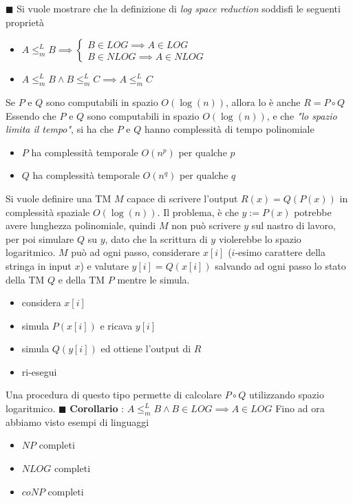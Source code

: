 \documentclass[10pt, letterpaper]{report}
\begin{document}
\hfill$\blacksquare$\acc 
Si vuole mostrare che la definizione di \textit{log space reduction} soddisfi le seguenti proprietà\begin{itemize}
    \item $A\le_m^L B \implies \begin{cases}
        B\in LOG \implies A\in LOG\\ 
        B\in NLOG \implies A\in NLOG
    \end{cases}$
    \item $A\le_m^L B \land B \le_m^L C \implies A \le_m^L C$
\end{itemize}
\teo{} Se $P$ e $Q$ sono computabili in spazio $O(\log(n))$, allora lo è anche $R=P\circ Q$\acc 
\dimo{} Essendo che $P$ e $Q$ sono computabili in spazio $O(\log(n))$, e che \textit{"lo spazio limita il tempo"}, si ha che $P$ e $Q$ hanno complessità di tempo polinomiale\begin{itemize}
    \item $P$ ha complessità temporale $O(n^p)$ per qualche $p$
    \item $Q$ ha complessità temporale $O(n^q)$ per qualche $q$
\end{itemize}
Si vuole definire una TM $M$ capace di scrivere l'output $R(x)=Q(P(x))$ in complessità spaziale $O(\log(n))$.\acc 
Il problema, è che $y:=P(x)$ potrebbe avere lunghezza polinomiale, quindi $M$ non può scrivere $y$ sul nastro di lavoro, per poi simulare $Q$ su $y$, dato che la scrittura di $y$ violerebbe lo spazio logaritmico.\acc
$M$ può ad ogni passo, considerare $x[i]$ ($i$-esimo carattere della stringa in input $x$) e valutare $y[i]=Q(x[i])$ salvando ad ogni passo lo stato della TM $Q$ e della TM $P$ mentre le simula.\begin{itemize}
    \item considera $x[i]$
    \item simula $P(x[i])$ e ricava $y[i]$
    \item simula $Q(y[i])$ ed ottiene l'output di $R$
    \item ri-esegui 
\end{itemize}
Una procedura di questo tipo permette di calcolare $P\circ Q$ utilizzando spazio logaritmico.
\hfill$\blacksquare$\acc 
\textbf{Corollario} : $A\le_m^L B \land B \in LOG \implies A \in LOG$\acc 
Fino ad ora abbiamo visto esempi di linguaggi\begin{itemize}
    \item $NP$ completi
    \item $NLOG$ completi
    \item $coNP$ completi
\end{itemize}
\end{document}
